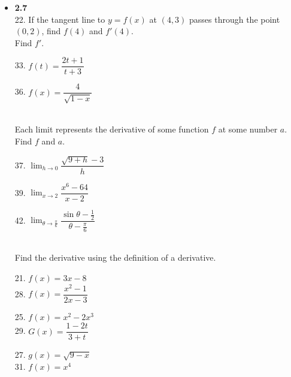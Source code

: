 \documentclass{letter}
\begin{document}
	\begin{itemize}
		\item[] \textbf{2.7}\\
		
		22. If the tangent line to $y=f(x)$ at $(4, 3)$ passes through the point $(0, 2)$, find $f(4)$ and $f'(4)$.\\
		
		Find $f'$.\\
		
		\begin{minipage}[t]{0.5\textwidth}
			33. $f(t) = \dfrac{2t + 1}{t+3}$
		\end{minipage}
		\begin{minipage}[t]{0.5\textwidth}
			36. $f(x) = \dfrac{4}{\sqrt{1-x}}$\\
		\end{minipage}\\
		
		Each limit represents the derivative of some function $f$ at some number $a$. Find $f$ and $a$.\\
		\begin{minipage}[t]{0.3\textwidth}
			37. $\displaystyle \lim_{h \to 0} \dfrac{\sqrt{9+h} - 3}{h}$
		\end{minipage}
		\begin{minipage}[t]{0.3\textwidth}
			39. $\displaystyle \lim_{x \to 2} \dfrac{x^6 - 64}{x-2}$
		\end{minipage}
		\begin{minipage}[t]{0.3\textwidth}
			42. $\displaystyle \lim_{\theta \to \frac{\pi}{6}} \dfrac{\sin \theta - \frac12}{\theta - \frac{\pi}{6}}$\\
		\end{minipage}\\
		
		Find the derivative using the definition of a derivative.\\
		\begin{minipage}[t]{0.3\textwidth}
			21. $f(x) = 3x - 8$\\
			28. $f(x) = \dfrac{x^2 - 1}{2x - 3}$
		\end{minipage}
		\begin{minipage}[t]{0.3\textwidth}
			25. $f(x) = x^2 - 2x^3$\\
			29. $G(x) = \dfrac{1-2t}{3+t}$\\
		\end{minipage}
		\begin{minipage}[t]{0.3\textwidth}
			27. $g(x) = \sqrt{9-x}$\\
			31. $f(x) = x^4$
		\end{minipage}\\
		

\end{itemize}
\end{document}
